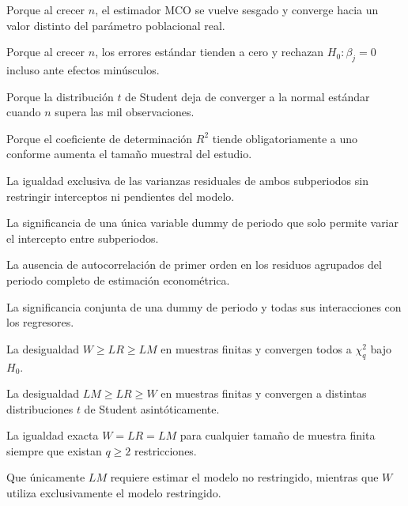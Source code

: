 \begin{opts}
    \item Porque al crecer $n$, el estimador MCO se vuelve sesgado y converge hacia un valor distinto del parámetro poblacional real.
    \item Porque al crecer $n$, los errores estándar tienden a cero y rechazan $H_0: \beta_j = 0$ incluso ante efectos minúsculos.
    \item Porque la distribución $t$ de Student deja de converger a la normal estándar cuando $n$ supera las mil observaciones.
    \item Porque el coeficiente de determinación $R^2$ tiende obligatoriamente a uno conforme aumenta el tamaño muestral del estudio.
\end{opts}

\begin{opts}
    \item La igualdad exclusiva de las varianzas residuales de ambos subperiodos sin restringir interceptos ni pendientes del modelo.
    \item La significancia de una única variable dummy de periodo que solo permite variar el intercepto entre subperiodos.
    \item La ausencia de autocorrelación de primer orden en los residuos agrupados del periodo completo de estimación econométrica.
    \item La significancia conjunta de una dummy de periodo y todas sus interacciones con los regresores.
\end{opts}

\begin{opts}
    \item La desigualdad $W \ge LR \ge LM$ en muestras finitas y convergen todos a $\chi^2_q$ bajo $H_0$.
    \item La desigualdad $LM \ge LR \ge W$ en muestras finitas y convergen a distintas distribuciones $t$ de Student asintóticamente.
    \item La igualdad exacta $W = LR = LM$ para cualquier tamaño de muestra finita siempre que existan $q \ge 2$ restricciones.
    \item Que únicamente $LM$ requiere estimar el modelo no restringido, mientras que $W$ utiliza exclusivamente el modelo restringido.
\end{opts}

